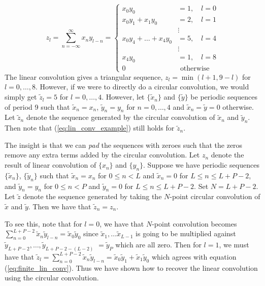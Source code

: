 \documentclass[12pt]{CSUNthesis}
\begin{document}
\begin{equation}
\label{eq:lin_conv_example}
z_l = \sum_{n=-\infty}^{\infty } x_n y_{l-n} = \begin{cases}
x_0 y_0 &= 1, \quad l=0\\
x_0 y_1 + x_1 y_0 &= 2, \quad l=1\\
& \vdots \\ 
x_0y_4 + \dots + x_4 y_0 &= 5, \quad l=4 \\
& \vdots \\
x_4y_0 &= 1, \quad l= 8 \\
0 &\text{ otherwise}
\end{cases}
\end{equation}
	The linear convolution gives a triangular sequence, $z_l = \min(l+1,9-l)$ for $l=0, \dots, 8$. However, if we were to directly do a circular convolution, we would simply get $\tilde{z}_l = 5$ for $ l=0, \dots, 4$. 
	However, let $\{ \tilde{x}_n \}$ and $\{\tilde{y}\}$ be periodic sequences of period 9 such that $\tilde{x}_n = x_n$, $\tilde{y}_n = y_n$ for $n=0, \dots, 4$ and $\tilde{x}_n=\tilde{y}=0$ otherwise. Let $\tilde{z}_n$ denote the sequence generated by the circular convolution of $\tilde{x}_n$ and $\tilde{y}_n$. Then note that (\ref{eq:lin_conv_example}) still holds for $\tilde{z}_n$. 

	The insight is that we can \textit{pad} the sequences with zeroes such that the zeros remove any extra terms added by the circular convolution. Let $z_n$ denote the result of linear convolution of $\{x_n\}$ and $\{y_n\}$. Suppose we have periodic sequences $\{\tilde{x}_n\}$, $\{\tilde{y}_n\}$ such that $\tilde{x}_n = x_n$ for $0 \leq n < L$ and $\tilde{x}_n = 0$ for $L \leq n \leq L+P-2$, and $\tilde{y}_n = y_n$ for $0 \leq n < P$ and $\tilde{y}_n = 0$ for $L \leq n \leq L+P-2$. Set $N=L+P-2$.
Let $\tilde{z}$ denote the sequence generated by taking the $N$-point circular convolution of $\tilde{x}$ and $\tilde{y}$. Then we have that $\tilde{z}_n = z_n$. 

To see this, note that for $l=0$, we have that $N$-point convolution becomes  $\sum_{n=0}^{L+P-2} \tilde{x}_n \tilde{y}_{l-n} = \tilde{x}_0 \tilde{y}_0$ since $\tilde{x}_1, \dots \tilde{x}_{L-1}$ is going to be multiplied against $\tilde{y}_{L+P-2}, \dots, \tilde{y}_{L+P-2-(L-2)}$ $=\tilde{y}_{P}$ which are all zero. Then for $l=1$, we must have that $\tilde{z}_l = \sum_{n=0}^{L+P-2} \tilde{x}_n \tilde{y}_{l-n} = \tilde{x}_0 \tilde{y}_1 + \tilde{x}_1 \tilde{y}_0$ which agrees with equation (\ref{eq:finite_lin_conv}). Thus we have shown how to recover the linear convolution using the circular convolution.
\end{document}
